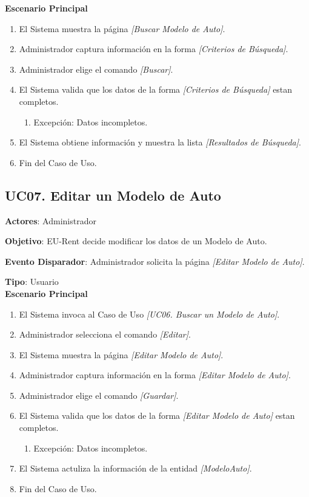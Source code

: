 \documentclass[10pt, letterpaper]{report}
\begin{document}
\textbf{Escenario Principal}

\begin{enumerate}
\item El Sistema muestra la página \textit{[Buscar Modelo de Auto]}.
\item Administrador captura información en la forma \textit{[Criterios de Búsqueda]}.
\item Administrador elige el comando \textit{[Buscar]}.
\item El Sistema valida que los datos de la forma \textit{[Criterios de Búsqueda]} estan completos.
	\begin{enumerate}
		\item Excepción: Datos incompletos.
	\end{enumerate}
\item El Sistema obtiene información y muestra la lista \textit{[Resultados de Búsqueda]}.
\item Fin del Caso de Uso.
\end{enumerate}
\subsection{UC07. Editar un Modelo de Auto} \label{sec:cueditarmodeloauto}
\textbf{Actores}: Administrador

\textbf{Objetivo}: EU-Rent decide modificar los datos de un Modelo de Auto.

\textbf{Evento Disparador}: Administrador solicita la página \textit{[Editar Modelo de Auto]}.

\textbf{Tipo}: Usuario\\

\textbf{Escenario Principal}

\begin{enumerate}
\item El Sistema invoca al Caso de Uso \textit{[UC06. Buscar un Modelo de Auto]}.
\item Administrador selecciona el comando \textit{[Editar]}.
\item El Sistema muestra la página \textit{[Editar Modelo de Auto]}.
\item Administrador captura información en la forma \textit{[Editar Modelo de Auto]}.
\item Administrador elige el comando \textit{[Guardar]}.
\item El Sistema valida que los datos de la forma \textit{[Editar Modelo de Auto]} estan completos.
	\begin{enumerate}
		\item Excepción: Datos incompletos.
	\end{enumerate}
\item El Sistema actuliza la información de la entidad \textit{[ModeloAuto]}.
\item Fin del Caso de Uso.
\end{enumerate}
\end{document}
